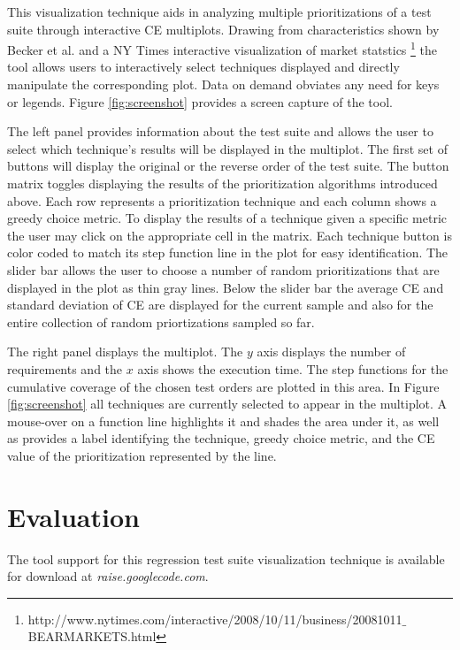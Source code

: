\documentclass{vgtc}                          %
\begin{document}
This visualization technique aids in analyzing multiple prioritizations of a test suite through interactive CE multiplots.  Drawing from characteristics shown by Becker et al$.$ \cite{Stephen95visualizingnetwork} and a NY Times interactive visualization of market statstics \footnote[1]{http://www.nytimes.com/interactive/2008/10/11/business/20081011$\_$BEARMARKETS.html} the tool allows users to interactively select techniques displayed and directly manipulate the corresponding plot.  Data on demand obviates any need for keys or legends.  Figure \ref{fig:screenshot} provides a screen capture of the tool.  

The left panel provides information about the test suite and allows the user to select which technique's results will be displayed in the multiplot.  The first set of buttons will display the original or the reverse order of the test suite.  The button matrix toggles displaying the results of the prioritization algorithms introduced above.  Each row represents a prioritization technique and each column shows a greedy choice metric.  To display the results of a technique given a specific metric the user may click on the appropriate cell in the matrix.  Each technique button is color coded to match its step function line in the plot for easy identification.  The slider bar allows the user to choose a number of random prioritizations that are displayed in the plot as thin gray lines.  Below the slider bar the average CE and standard deviation of CE are displayed for the current sample and also for the entire collection of random priortizations sampled so far.

The right panel displays the multiplot.   The $y$ axis displays the number of requirements and the $x$ axis shows the execution time.  The step functions for the cumulative coverage of the chosen test orders are plotted in this area.  In Figure \ref{fig:screenshot} all techniques are currently selected to appear in the multiplot.  A mouse-over on a function line highlights it and shades the area under it, as well as provides a label identifying the technique, greedy choice metric, and the CE value of the prioritization represented by the line.    

\section{Evaluation}

 The tool support for this regression test suite visualization technique is available for download at \textit{raise.googlecode.com}.
 
\end{document}
